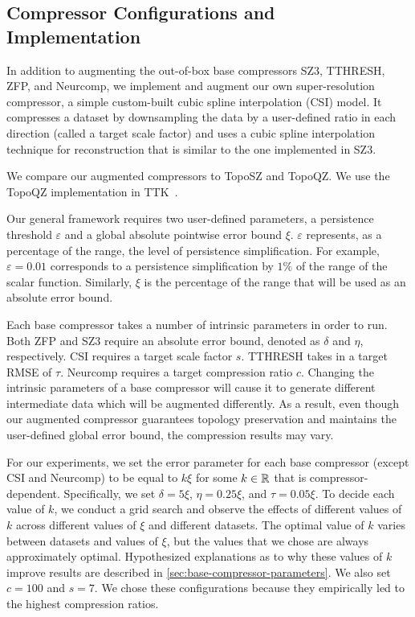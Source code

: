\subsection{Compressor Configurations and Implementation}
\label{sec:configurations}

In addition to augmenting the out-of-box base compressors SZ3, TTHRESH, ZFP, and Neurcomp, we implement and augment our own super-resolution compressor, a simple custom-built cubic spline interpolation (CSI) model.
It compresses a dataset by downsampling the data by a user-defined ratio in each direction (called a target scale factor) and uses a cubic spline interpolation technique for reconstruction that is similar to the one implemented in SZ3.

We compare our augmented compressors to TopoSZ and TopoQZ. We use the TopoQZ implementation in TTK~\cite{TiernyFavelierLevine2017}. 

Our general framework requires two user-defined parameters, a persistence threshold $\varepsilon$ and a global absolute pointwise error bound $\xi$.
$\varepsilon$ represents, as a percentage of the range, the level of persistence  simplification. 
For example, $\varepsilon = 0.01$ corresponds to a persistence simplification by $1\%$ of the range of the scalar function. Similarly, $\xi$ is the percentage of the range that will be used as an absolute error bound.

Each base compressor takes a number of intrinsic parameters in order to run. 
Both ZFP and SZ3 require an absolute error bound, denoted as $\delta$ and $\eta$, respectively. 
CSI requires a target scale factor $s$.
TTHRESH takes in a target RMSE of $\tau$. 
Neurcomp requires a target compression ratio $c$. 
Changing the intrinsic parameters of a base compressor will cause it to generate different intermediate data which will be augmented differently. 
As a result, even though our augmented compressor guarantees topology preservation and maintains the user-defined global error bound, the compression results may vary. 

For our experiments, we set the error parameter for each base compressor (except CSI and Neurcomp) to be equal to $k\xi$ for some $k \in \mathbb{R}$ that is compressor-dependent. Specifically, we set $\delta = 5\xi$, $\eta = 0.25\xi$, and $\tau = 0.05\xi$. To decide each value of $k$, we conduct a grid search and observe the effects of different values of $k$ across different values of $\xi$ and different datasets. The optimal value of $k$ varies between datasets and values of $\xi$, but the values that we chose are always approximately optimal. Hypothesized explanations as to why these values of $k$ improve results are described in \cref{sec:base-compressor-parameters}. We also set $c = 100$ and $s = 7$. We chose these configurations because they empirically led to the highest compression ratios.

